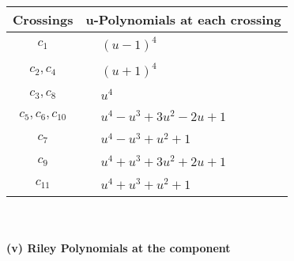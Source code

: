 \documentclass[1p]{elsarticle_modified}
\theoremstyle{definition}
\begin{document}
\begin{tabular}{m{50pt}|m{274pt}}
Crossings & \hspace{64pt}u-Polynomials at each crossing \\
\hline $$\begin{aligned}c_{1}\end{aligned}$$&$\begin{aligned}
&(u-1)^4
\end{aligned}$\\
\hline $$\begin{aligned}c_{2},c_{4}\end{aligned}$$&$\begin{aligned}
&(u+1)^4
\end{aligned}$\\
\hline $$\begin{aligned}c_{3},c_{8}\end{aligned}$$&$\begin{aligned}
&u^4
\end{aligned}$\\
\hline $$\begin{aligned}c_{5},c_{6},c_{10}\end{aligned}$$&$\begin{aligned}
&u^4- u^3+3 u^2-2 u+1
\end{aligned}$\\
\hline $$\begin{aligned}c_{7}\end{aligned}$$&$\begin{aligned}
&u^4- u^3+u^2+1
\end{aligned}$\\
\hline $$\begin{aligned}c_{9}\end{aligned}$$&$\begin{aligned}
&u^4+u^3+3 u^2+2 u+1
\end{aligned}$\\
\hline $$\begin{aligned}c_{11}\end{aligned}$$&$\begin{aligned}
&u^4+u^3+u^2+1
\end{aligned}$\\
\hline
\end{tabular}\\~\\
\newpage\renewcommand{\arraystretch}{1}
\flushleft \textbf{(v) Riley Polynomials at the component}\newline \\
\end{document}
